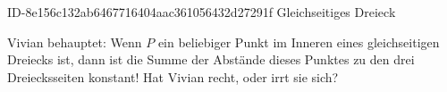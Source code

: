 \begin{exercise}
      {ID-8e156c132ab6467716404aac361056432d27291f}
      {Gleichseitiges Dreieck}
  \ifproblem\problem\par
    Vivian behauptet: \glqq Wenn $P$ ein beliebiger Punkt im Inneren eines
    gleichseitigen Dreiecks ist, dann ist die Summe der Abstände dieses Punktes
    zu den drei Dreiecksseiten konstant!\grqq{} Hat Vivian recht, oder irrt
    sie sich?
  \fi
\end{exercise}
